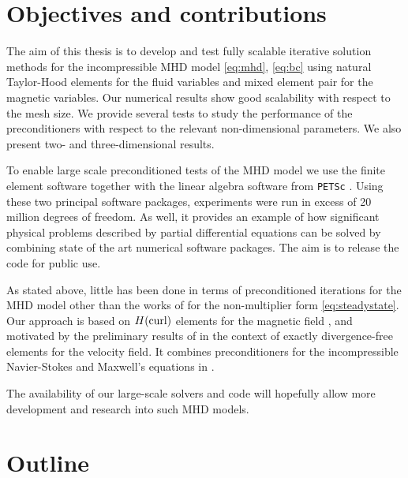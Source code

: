 \section{Objectives and contributions}

The aim of this thesis is to develop and test fully scalable iterative solution methods for the incompressible MHD model \eqref{eq:mhd}, \eqref{eq:bc} using natural Taylor-Hood elements \cite{taylor1973numerical} for the fluid variables and \nedelec mixed element  \cite{nedelec1980mixed} pair for the magnetic variables.  Our numerical results show good scalability with respect to the mesh size. We provide  several tests  to study the performance of the preconditioners with respect to the relevant non-dimensional parameters. We also present two- and three-dimensional results.

To enable large scale preconditioned tests of the MHD model we use the finite element software \fenics \cite{wells2012automated} together with the linear algebra software from {\tt PETSc} \cite{petsc-web-page,petsc-user-ref}. Using these two principal software packages, experiments were run in excess of 20 million degrees of freedom. As well, it provides an example of how significant physical problems described by partial differential equations can be solved by combining state of the art numerical software packages. The aim is to release the code for public use.

As stated above,  little has been done in terms of preconditioned iterations for the MHD model other than the works of  \cite{phillips2014block} for the non-multiplier form \eqref{eq:steadystate}. Our approach is based on $H({\rm curl})$ elements for the magnetic field \cite{schotzau2004mixed}, and motivated by the preliminary results of \cite{li2010numerical} in the context of exactly divergence-free elements for the velocity field. It combines preconditioners for the incompressible Navier-Stokes and Maxwell's equations in \cite{elman2005finite,greif2007preconditioners,MR2911387}.


The availability of our large-scale solvers and code will hopefully allow more development and research into such MHD models.

\section{Outline}

